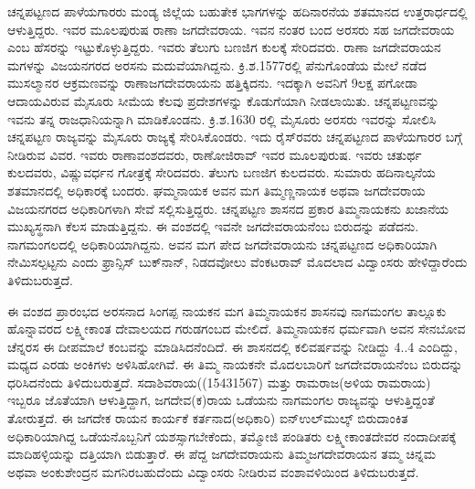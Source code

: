 ಚನ್ನಪಟ್ಟಣದ ಪಾಳೆಯಗಾರರು ಮಂಡ್ಯ ಜಿಲ್ಲೆಯ ಬಹುತೇಕ ಭಾಗಗಳನ್ನು ಹದಿನಾರನೆಯ ಶತಮಾನದ ಉತ್ತರಾರ್ಧದಲ್ಲಿ ಆಳುತ್ತಿದ್ದರು. ಇವರ ಮೂಲಪುರುಷ ರಾಣಾ ಜಗದೇವರಾಯ. ಇವನ ನಂತರ ಬಂದ ಅರಸರು ಸಹ ಜಗದೇವರಾಯ ಎಂಬ ಹೆಸರನ್ನು ಇಟ್ಟುಕೊಳ್ಳುತ್ತಿದ್ದರು. ಇವರು ತೆಲುಗು ಬಣಜಿಗ ಕುಲಕ್ಕೆ ಸೇರಿದವರು. ರಾಣಾ ಜಗದೇವರಾಯನ ಮಗಳನ್ನು ವಿಜಯನಗರದ ಅರಸನು ಮದುವೆಯಾಗಿದ್ದನು. ಕ್ರಿ.ಶ.1577ರಲ್ಲಿ ಪೆನುಗೊಂಡೆಯ ಮೇಲೆ ನಡೆದ ಮುಸಲ್ಮಾನರ ಆಕ್ರಮಣವನ್ನು ರಾಣಾಜಗದೇವರಾಯನು ಹತ್ತಿಕ್ಕಿದನು. ಇದಕ್ಕಾಗಿ ಅವನಿಗೆ 9ಲಕ್ಷ ಪಗೋಡಾ ಆದಾಯವಿರುವ ಮೈಸೂರು ಸೀಮೆಯ ಕೆಲವು ಪ್ರದೇಶಗಳನ್ನು ಕೊಡುಗೆಯಾಗಿ ನೀಡಲಾಯಿತು. ಚನ್ನಪಟ್ಟಣವನ್ನು ಇವನು ತನ್ನ ರಾಜಧಾನಿಯನ್ನಾಗಿ ಮಾಡಿಕೊಂಡನು. ಕ್ರಿ.ಶ.1630 ರಲ್ಲಿ ಮೈಸೂರು ಅರಸರು ಇವರನ್ನು ಸೋಲಿಸಿ ಚನ್ನಪಟ್ಟಣ ರಾಜ್ಯವನ್ನು ಮೈಸೂರು ರಾಜ್ಯಕ್ಕೆ ಸೇರಿಸಿಕೊಂಡರು. ಇದು ರೈಸ್​ರವರು ಚನ್ನಪಟ್ಟಣದ ಪಾಳೆಯಗಾರರ ಬಗ್ಗೆ ನೀಡಿರುವ ವಿವರ. ಇವರು ರಾಣಾವಂಶದವರು, ರಾಣೋಜಿರಾವ್​ ಇವರ ಮೂಲಪುರುಷ. ಇವರು ಚತುರ್ಥ ಕುಲದವರು, ವಿಷ್ಣುವರ್ಧನ ಗೋತ್ರಕ್ಕೆ ಸೇರಿದವರು. ತೆಲುಗು ಬಣಜಿಗ ಕುಲದವರು. ಸುಮಾರು ಹದಿನಾಲ್ಕನೆಯ ಶತಮಾನದಲ್ಲಿ ಅಧಿಕಾರಕ್ಕೆ ಬಂದರು. ಘಮ್ಮನಾಯಕ ಅವನ ಮಗ ತಿಮ್ಮಣ್ಣನಾಯಕ ಅಥವಾ ಜಗದೇವರಾಯ ವಿಜಯನಗರದ ಅಧಿಕಾರಿಗಳಾಗಿ ಸೇವೆ ಸಲ್ಲಿಸುತ್ತಿದ್ದರು. ಚನ್ನಪಟ್ಟಣ ಶಾಸನದ ಪ್ರಕಾರ ತಿಮ್ಮನಾಯಕನು ಖಜಾನೆಯ ಮುಖ್ಯಸ್ಥನಾಗಿ ಕೆಲಸ ಮಾಡುತ್ತಿದ್ದನು. ಈ ವಂಶದಲ್ಲಿ ಇವನೇ ಜಗದೇವರಾಯನೆಂಬ ಬಿರುದನ್ನು ಪಡೆದನು. ನಾಗಮಂಗಲದಲ್ಲಿ ಅಧಿಕಾರಿಯಾಗಿದ್ದನು. ಅವನ ಮಗ ಪೇದ ಜಗದೇವರಾಯನು ಚನ್ನಪಟ್ಟಣದ ಅಧಿಕಾರಿಯಾಗಿ ನೇಮಿಸಲ್ಪಟ್ಟನು ಎಂದು ಫ್ರಾನ್ಸಿಸ್​ ಬುಕ್​ನಾನ್​, ನಿಡದವೋಲು ವೆಂಕಟರಾವ್​ ಮೊದಲಾದ ವಿದ್ವಾಂಸರು ಹೇಳಿದ್ದಾರೆಂದು ತಿಳಿದುಬರುತ್ತದೆ.

ಈ ವಂಶದ ಪ್ರಾರಂಭದ ಅರಸನಾದ ಸಿಂಗಪ್ಪ ನಾಯಕನ ಮಗ ತಿಮ್ಮನಾಯಕನ ಶಾಸನವು ನಾಗಮಂಗಲ ತಾಲ್ಲೂಕು ಹೊನ್ನಾವರದ ಲಕ್ಷ್ಮೀಕಾಂತ ದೇವಾಲಯದ ಗರುಡಗಂಬದ ಮೇಲಿದೆ. ತಿಮ್ಮನಾಯಕನ ಧರ್ಮವಾಗಿ ಅವನ ಸೇನಬೋವ ಚೆನ್ನರಸ ಈ ದೀಪಮಾಲೆ ಕಂಬವನ್ನು ಮಾಡಿಸಿದನೆಂದಿದೆ. ಈ ಶಾಸನದಲ್ಲಿ ಕಲಿವರ್ಷವನ್ನು ನೀಡಿದ್ದು 4..4 ಎಂದಿದ್ದು, ಮಧ್ಯದ ಎರಡು ಅಂಕಿಗಳು ಅಳಿಸಿಹೋಗಿವೆ. ಈ ತಿಮ್ಮ ನಾಯಕನೇ ಮೊದಲಬಾರಿಗೆ ಜಗದೇವರಾಯನೆಂಬ ಬಿರುದನ್ನು ಧರಿಸಿದನೆಂದು ತಿಳಿದುಬರುತ್ತದೆ. ಸದಾಶಿವರಾಯ((15431567) ಮತ್ತು ರಾಮರಾಜ(ಅಳಿಯ ರಾಮರಾಯ) ಇಬ್ಬರೂ ಜೊತೆಯಾಗಿ ಆಳುತ್ತಿದ್ದಾಗ, ಜಗದೇವ(ಕ)ರಾಯ ಒಡೆಯನು ನಾಗಮಂಗಲ ರಾಜ್ಯವನ್ನು ಆಳುತ್ತಿದ್ದಂತೆ ತೋರುತ್ತದೆ. ಈ ಜಗದೇಕ ರಾಯನ ಕಾರ್ಯಕೆ ಕರ್ತನಾದ(ಅಧಿಕಾರಿ) ಐನ್​ಉಲ್​ಮುಲ್ಕ್​ ಬಿರುದಾಂಕಿತ ಅಧಿಕಾರಿಯಾಗಿದ್ದ ಒಡೆಯನೊಬ್ಬನಿಗೆ ಯಶಸ್ಸಾಗಬೇಕೆಂದು, ತಮ್ಮೋಜಿ ಪಂಡಿತರು ಲಕ್ಷ್ಮೀಕಾಂತದೇವರ ನಂದಾದೀಪಕ್ಕೆ ಮಾದಿಹಳ್ಳಿಯನ್ನು ದತ್ತಿಯಾಗಿ ಬಿಡುತ್ತಾರೆ. ಈ ಪೆದ್ದ ಜಗದೇವರಾಯನು ತಿಮ್ಮಜಗದೇವರಾಯನ ತಮ್ಮ ಚಿನ್ನಮ ಅಥವಾ ಅಂಕುಶೇಂದ್ರನ ಮಗನಿರಬಹುದೆಂದು ವಿದ್ವಾಂಸರು ನೀಡಿರುವ ವಂಶಾವಳಿಯಿಂದ ತಿಳಿದುಬರುತ್ತದೆ.

